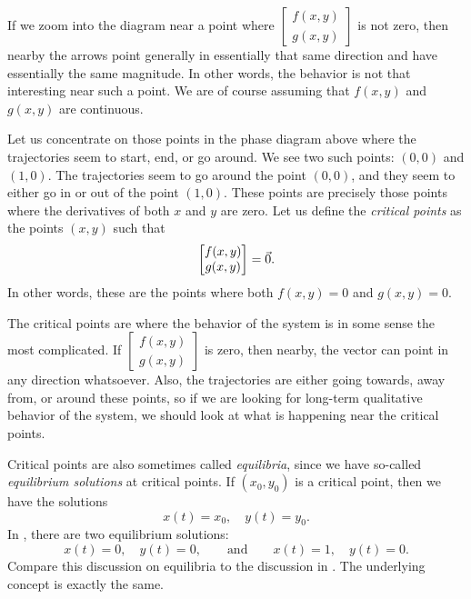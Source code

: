 If we zoom into the diagram near a point where 
$\left[ \begin{smallmatrix} f(x,y) \\ g(x,y) \end{smallmatrix} \right]$ is
not zero, then nearby the arrows point generally in essentially that same
direction and have essentially the same magnitude.
In other words, the behavior is not that interesting near such a point.
We are of course assuming that $f(x,y)$ and $g(x,y)$ are continuous.

Let us concentrate on those points in the phase diagram
above where the trajectories
seem to start, end, or go around.  We see two such points:
$(0,0)$ and $(1,0)$.  The trajectories seem to go around the point $(0,0)$,
and they seem to either go in or out of the point $(1,0)$.
%
These points are precisely those points where the derivatives of both $x$
and $y$ are zero.  Let us define the \emph{critical points}
as the points $(x,y)$ such that
\begin{equation*} 
\begin{bmatrix} f(x,y) \\ g(x,y) \end{bmatrix} = \vec{0} .
\avoidbreak
\end{equation*}
In other words, these are the points where both $f(x,y)=0$ and $g(x,y)=0$.

The critical points are where the behavior of the system is
in some sense the most complicated.  If
$\left[ \begin{smallmatrix} f(x,y) \\ g(x,y) \end{smallmatrix} \right]$
is zero, then nearby, the vector can point in any direction whatsoever.
Also, the trajectories are either going towards, away from, or around these
points, so if we are looking for long-term qualitative behavior of the system, we
should look at what is happening near the critical points.

Critical points are also sometimes called
\emph{equilibria}, since we have so-called
\emph{equilibrium solutions} at critical points.
If $(x_0,y_0)$ is a critical point, then we have the solutions
\begin{equation*}
x(t) = x_0, \quad y(t) = y_0 .
\end{equation*}
In , there are two equilibrium
solutions:
\begin{equation*}
x(t) = 0, \quad y(t) = 0,
\qquad \text{and} \qquad
x(t) = 1, \quad y(t) = 0.
\end{equation*}
Compare this discussion on equilibria to the discussion in
.  The underlying concept is
exactly the same.

